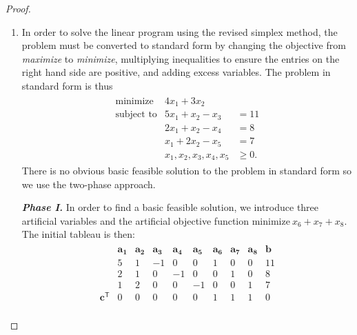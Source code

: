 \documentclass[12pt]{article}
\theoremstyle{definition}
\newcommand{\vect}[1]{\boldsymbol{#1}}
\newcommand{\tran}{\mathsf{T}}
\begin{document}
\begin{proof}
  \begin{enumerate}
    \item In order to solve the linear program using the revised simplex method,
      the problem must be converted to standard form by changing the objective
      from \textit{maximize} to \textit{minimize}, multiplying inequalities to ensure
      the entries on the right hand side are positive, and adding excess
      variables. The problem in standard form is thus
      \begin{align*}
        \begin{array}{rll}
          \text{minimize} & 4x_1 +3x_2 &\\
          \text{subject to} &5x_1 + x_2 - x_3 &= 11 \\
          & 2x_1 + x_2 - x_4 &= 8 \\
          & x_1 + 2x_2 - x_5 &= 7 \\
          & x_1, x_2, x_3, x_4, x_5 &\geq 0.
        \end{array}
      \end{align*}
      There is no obvious basic feasible solution to the problem in standard form so
      we use the two-phase approach.

      \textbf{\textit{Phase I.}} In order to find a basic feasible solution, we introduce
      three artificial variables and the artificial objective function
      $\text{minimize}\ x_6 + x_7 + x_8$. The initial tableau is then:
      \begin{align*}
        \begin{matrix}
          & \vect{a_1} & \vect{a_2} & \vect{a_3} & \vect{a_4} & \vect{a_5} & \vect{a_6} & \vect{a_7} & \vect{a_8} & \vect{b} \\
                         & 5 & 1 & -1 & 0 & 0 & 1 & 0 & 0 & 11 \\
                         & 2 & 1 & 0 & -1 & 0 & 0 & 1 & 0 & 8 \\
                         & 1 & 2 & 0 & 0 & -1 & 0 & 0 & 1 & 7 \\
          \vect{c}^\tran  & 0 & 0 & 0 & 0 & 0 & 1 & 1 & 1 & 0 \\
        \end{matrix}
      \end{align*}


\end{enumerate}
\end{proof}
\end{document}
